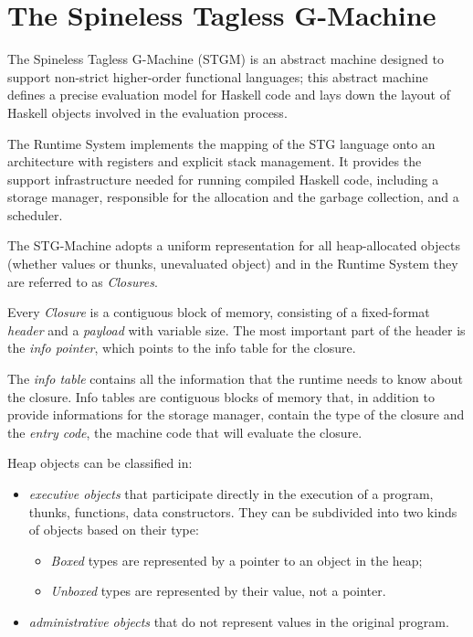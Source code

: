 \section{The Spineless Tagless G-Machine}

The Spineless Tagless G-Machine (STGM) is an abstract machine designed to support non-strict higher-order functional languages; this abstract machine defines a precise evaluation model for Haskell code and lays down the layout of Haskell objects involved in the evaluation process. \cite{export:67083}

The Runtime System implements the mapping of the STG language onto an architecture with registers and explicit stack management. It provides the support infrastructure needed for running compiled Haskell code, including a storage manager, responsible for the allocation and the garbage collection, and a scheduler.

The STG-Machine adopts a uniform representation for all heap-allocated objects (whether values or thunks, \ie unevaluated object) and in the Runtime System they are referred to as \emph{Closures}.

Every \emph{Closure} is a contiguous block of memory, consisting of a fixed-format \emph{header} and a \emph{payload} with variable size.
The most important part of the header is the \emph{info pointer},  which points to the info table for the closure.

The \emph{info table} contains all the information that the runtime needs to know about the closure.
Info tables are contiguous blocks of memory that, in addition to provide informations for the storage manager, contain the type of the closure and the \emph{entry code}, \ie the machine code that will evaluate the closure.

Heap objects can be classified in:
\begin{itemize}
\item \emph{executive objects} that participate directly in the execution of a program, \eg thunks, functions, data constructors. They can be subdivided into two kinds of objects based on their type:
\begin{itemize}
\item \emph{Boxed} types are represented by a pointer to an object in the heap;
\item \emph{Unboxed} types are represented by their value, not a pointer.
\end{itemize}
\item \emph{administrative objects} that do not represent values in the original program.
\end{itemize}

